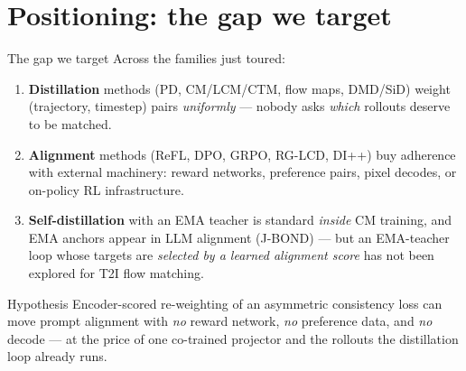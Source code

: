 \documentclass[aspectratio=169,10pt]{beamer}
\begin{document}
\section{Positioning: the gap we target}

\begin{frame}{The gap we target}
  Across the families just toured:
  \begin{enumerate}
    \item \textbf{Distillation} methods (PD, CM/LCM/CTM, flow maps, DMD/SiD)
      weight (trajectory, timestep) pairs \emph{uniformly} --- nobody asks
      \emph{which} rollouts deserve to be matched.
    \item \textbf{Alignment} methods (ReFL, DPO, GRPO, RG-LCD, DI++) buy
      adherence with external machinery: reward networks, preference pairs,
      pixel decodes, or on-policy RL infrastructure.
    \item \textbf{Self-distillation} with an EMA teacher is standard
      \emph{inside} CM training, and EMA anchors appear in LLM alignment
      (J-BOND) --- but an EMA-teacher loop whose targets are
      \emph{selected by a learned alignment score} has not been explored for
      T2I flow matching.
  \end{enumerate}
  \vspace{0.4em}
  \begin{alertblock}{Hypothesis}
    Encoder-scored re-weighting of an asymmetric consistency loss can move
    prompt alignment with \emph{no} reward network, \emph{no} preference
    data, and \emph{no} decode --- at the price of one co-trained projector
    and the rollouts the distillation loop already runs.
  \end{alertblock}
\end{frame}
\end{document}

